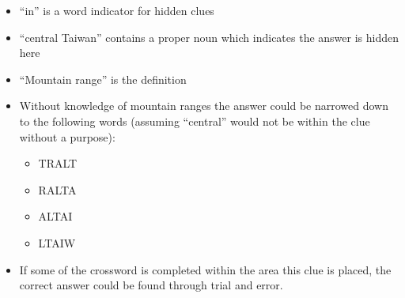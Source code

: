 \begin{itemize}
    \item ``in'' is a word indicator for hidden clues 
    \item ``central Taiwan'' contains a proper noun which indicates the answer 
    is hidden here 
    \item ``Mountain range'' is the definition 
    \item Without knowledge of mountain ranges the answer could be narrowed 
    down to the following words (assuming ``central'' would not be within the 
    clue without a purpose):
    \begin{itemize}
        \item TRALT 
        \item RALTA 
        \item ALTAI 
        \item LTAIW
    \end{itemize} 
    \item If some of the crossword is completed within the area this clue is 
    placed, the correct answer could be found through trial and error.
\end{itemize}
